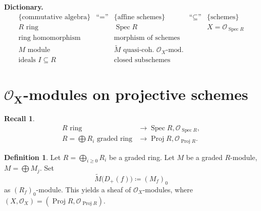 \documentclass[12pt]{article}
\DeclareMathOperator{\Spec}{Spec}
\DeclareMathOperator{\Proj}{Proj}
\theoremstyle{definition}
\newtheorem*{definition}{Definition}
\newtheorem*{recall}{Recall}
\begin{document}
\textbf{Dictionary.}
\[
\begin{array}{ccccc}
\{\text{commutative algebra}\}&\text{``}=\text{''}&\{\text{affine schemes}\}&\text{``}\subseteq\text{''}&\{\text{schemes}\}\\
R\text{ ring}&&\Spec R&&X=\mathcal{O}_{\Spec R}\\
\text{ring homomorphism}&&\text{morphism of schemes}\\
M\text{ module}&&\widetilde{M}\text{ quasi-coh. }\mathcal{O}_X\text{-mod.}\\
\text{ideals }I\subseteq R&&\text{closed subschemes}
\end{array}
\]

\section{\texorpdfstring{$\boldsymbol{\mathcal{O}_X}$-m}{M}odules on projective schemes}

\begin{recall}
\begin{align*}
R\text{ ring}&\longrightarrow\Spec R,\mathcal{O}_{\Spec R},\\
R=\bigoplus R_i\text{ graded ring}&\longrightarrow\Proj R,\mathcal{O}_{\Proj R}.
\end{align*}
\end{recall}

\begin{definition}
Let $R=\bigoplus_{i\geq0}R_i$ be a graded ring. Let $M$ be a graded $R$-module, $M=\bigoplus M_j$. Set
\[\widetilde{M}\big(D_+(f)\big)\coloneqq(M_f)_0\]
as $(R_f)_0$-module. This yields a sheaf of $\mathcal{O}_X$-modules, where $(X,\mathcal{O}_X)=(\Proj R,\mathcal{O}_{\Proj R})$.
\end{definition}
\end{document}
